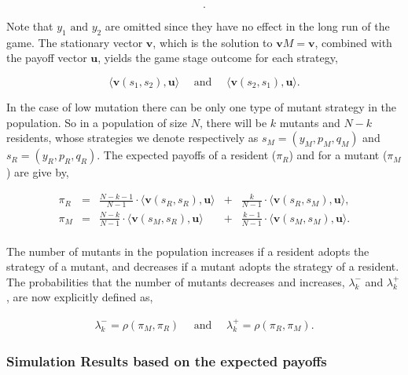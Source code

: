 \documentclass[11pt]{article}
\theoremstyle{plainCl1}
\theoremstyle{plainCl2}
\begin{document}
\begin{equation}\label{eq:transition_matrix}
  .
\end{equation}

Note that \(y_1 \text{ and } y_2\) are omitted since they have no effect in the
long run of the game. The stationary vector \(\mathbf{v}\),
which is the solution to \(\mathbf{v} M = \mathbf{v}\), combined with the payoff vector
\(\mathbf{u}\), yields the game stage outcome for each strategy,

\[\langle\mathbf{v}(s_1,s_2),\mathbf{u}\rangle \quad  \text{ and } \quad  \langle\mathbf{v}(s_2,s_1), \mathbf{u}\rangle.\]

In the case of low mutation there can be only one type of mutant strategy in the
population. So in a population of size \(N\), there will be \(k\) mutants and
\(N - k\) residents, whose strategies we denote respectively as \(s_M =(y_M,
p_M, q_M)\) and \(s_R = (y_R, p_R, q_R)\).
The expected payoffs of a resident (\(\pi_R\)) and for a
mutant (\(\pi_M\)) are give by,

\begin{equation} \label{Eq:ExpPay}
  \begin{array}{lcrcr}
  \displaystyle \pi_R & = &\displaystyle \frac{N\!-\!k\!-\!1}{N-1}\cdot \langle\mathbf{v}(s_R,s_R),\mathbf{u}\rangle	&+	&\displaystyle\frac{k}{N-1}\cdot \langle\mathbf{v}(s_R,s_M),\mathbf{u}\rangle,\\[0.5cm]
  \displaystyle \pi_M & = &\displaystyle\frac{N-k}{N-1}\cdot \langle\mathbf{v}(s_M,s_R),\mathbf{u}\rangle&+	&\displaystyle\frac{k-1}{N-1}\cdot \langle\mathbf{v}(s_M,s_M),\mathbf{u}\rangle.\\
  \end{array}
\end{equation}

The number of mutants in the population increases if a resident adopts the strategy
of a mutant, and decreases if a mutant adopts the strategy of a resident. The
probabilities that the number of mutants decreases and increases,
\(\lambda^-_k\) and \(\lambda^+_k\), are now explicitly defined as,

\begin{align*}
  \lambda^-_k \!=\!\rho(\pi_M, \pi_R) \quad \text{ and } \quad \lambda^+_k \!=\!\rho(\pi_R, \pi_M).
\end{align*}

\subsubsection*{Simulation Results based on the expected payoffs}
\end{document}
